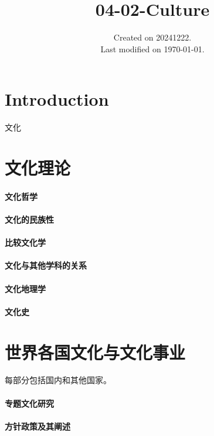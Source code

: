\documentclass[UTF8]{../../ApplicationUniverse}
\begin{document}
\title{04-02-Culture}
\date{Created on 20241222.\\   Last modified on \today.}
\maketitle
\tableofcontents


\chapter{Introduction}


文化 



\chapter{文化理论}
\subsubsection{文化哲学}
\subsubsection{文化的民族性}
\subsubsection{比较文化学}
\subsubsection{文化与其他学科的关系}
\subsubsection{文化地理学}
\subsubsection{文化史}


\chapter{世界各国文化与文化事业}

每部分包括国内和其他国家。



\subsubsection{专题文化研究}

\subsubsection{方针政策及其阐述}
\end{document}
